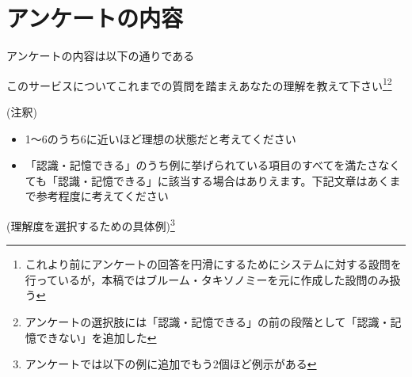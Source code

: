 \section{アンケートの内容}
アンケートの内容は以下の通りである\newline

\renewcommand{\thefootnote}{*\arabic{footnote}}
このサービスについてこれまでの質問を踏まえあなたの理解を教えて下さい\footnote{これより前にアンケートの回答を円滑にするためにシステムに対する設問を行っているが，本稿ではブルーム・タキソノミーを元に作成した設問のみ扱う}\footnote{アンケートの選択肢には「認識・記憶できる」の前の段階として「認識・記憶できない」を追加した}\newline

(注釈)
\begin{itemize}
    \item 1～6のうち6に近いほど理想の状態だと考えてください
    \item 「認識・記憶できる」のうち例に挙げられている項目のすべてを満たさなくても「認識・記憶できる」に該当する場合はありえます。下記文章はあくまで参考程度に考えてください
\end{itemize}
(理解度を選択するための具体例)\footnote{アンケートでは以下の例に追加でもう2個ほど例示がある}

\renewcommand{\arraystretch}{1.5} %
\scriptsize

